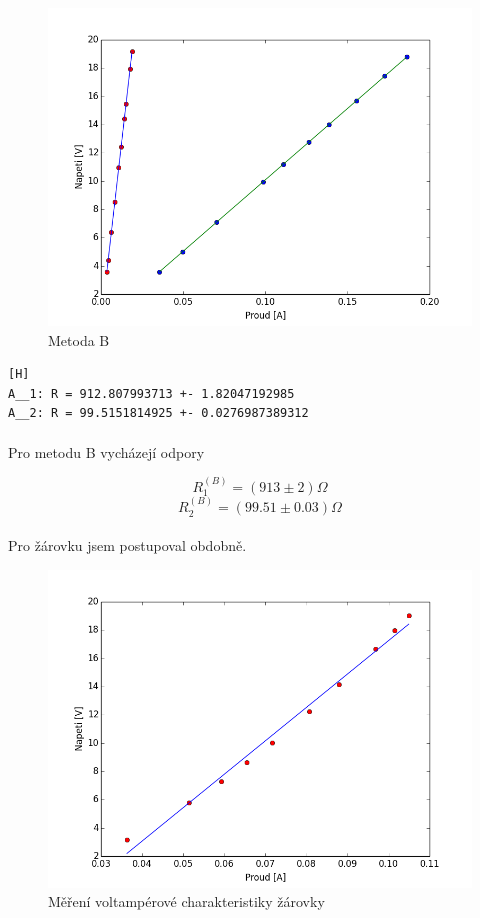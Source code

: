 \documentclass[a4paper,11pt]{article}
\begin{document}
    \begin{figure}[H]
        \centering
        \includegraphics[width=0.6\linewidth]{B.png}
        \caption{Metoda B}
    \end{figure}

\begin{lstlisting}[language=Bash][H]
A__1: R = 912.807993713 +- 1.82047192985
A__2: R = 99.5151814925 +- 0.0276987389312\end{lstlisting}

    \paragraph{} Pro metodu B vycházejí odpory

    \begin{equation}
        R^{(B)}_{1} = (913 \pm 2) \Omega
    \end{equation}
    \begin{equation}
        R^{(B)}_{2} = (99.51 \pm 0.03) \Omega
    \end{equation}

    \paragraph{} Pro žárovku jsem postupoval obdobně.

    \begin{figure}[H]
        \centering
        \includegraphics[width=0.6\linewidth]{C.png}
        \caption{Měření voltampérové charakteristiky žárovky}
    \end{figure}
\end{document}
